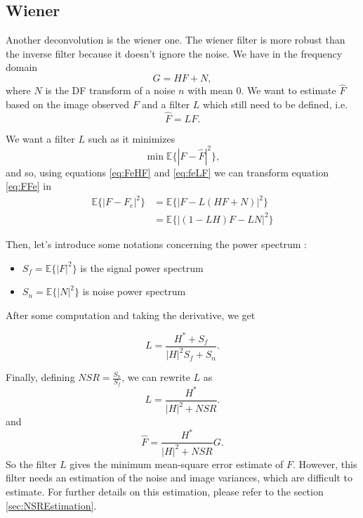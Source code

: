 \subsection{Wiener}
\label{subsec:Wiener}
 Another deconvolution is the wiener one. The wiener filter is more robust than the inverse filter because it doesn't ignore the noise. We have in the frequency domain
\begin{equation}
G = HF + N,
\label{eq:FeHF}
\end{equation} 
 where $N$ is the DF transform of a noise $n$ with mean $0$. We want to estimate $\hat{F}$ based on the image observed $F$ and a filter $L$ which still need to be defined, i.e. 
 \begin{equation}
\hat{F} = LF.
 \label{eq:feLF}
 \end{equation}

We want a filter $L$ such as it minimizes 
\begin{equation}
\min \mathbb{E}\{|F - \hat{F}|^2\},
\label{eq:FFe}
\end{equation}
and so, using equations \eqref{eq:FeHF} and \eqref{eq:feLF} we can transform equation \eqref{eq:FFe} in 
\begin{align*}
\mathbb{E}\{|F - F_e|^2\} &= \mathbb{E}\{|F - L(HF+N)|^2\}\\
	&= \mathbb{E}\{|(1-LH)F - LN|^2\}
\end{align*}

Then, let's introduce some notations concerning the power spectrum :
\begin{itemize}
\item $S_f = \mathbb{E}\{|F|^2\}$ is the signal power spectrum
\item $S_n = \mathbb{E}\{|N|^2\}$ is noise power spectrum 
\end{itemize}

After some computation and taking the derivative, we get

\begin{equation}
L = \frac{H^*+S_f}{|H|^2 S_f + S_n}.
\label{eq:LsemiFinal}
\end{equation}

Finally, defining $NSR = \frac{S_n}{S_f}$, we can rewrite $L$ as 
\begin{equation}
L = \frac{H^*}{|H|^2 + NSR}.
\end{equation}
and 
\begin{equation}
 \hat{F} = \frac{H^*}{|H|^2 + NSR} G.
\end{equation}
So the filter $L$ gives the minimum mean-square error estimate of $F$.
However, this filter needs an estimation of the noise and image variances, which are difficult to estimate. For further details on this estimation, please refer to the section \ref{sec:NSREstimation}.

